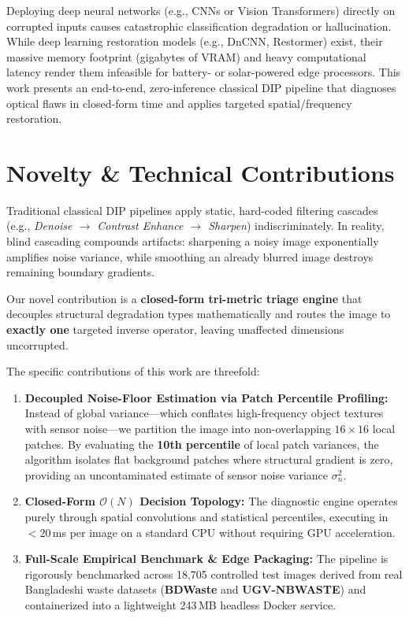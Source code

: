 \documentclass[conference]{IEEEtran}
\begin{document}
Deploying deep neural networks (e.g., CNNs or Vision Transformers) directly on corrupted inputs causes catastrophic classification degradation or hallucination. While deep learning restoration models (e.g., DnCNN, Restormer) exist, their massive memory footprint (gigabytes of VRAM) and heavy computational latency render them infeasible for battery- or solar-powered edge processors. This work presents an end-to-end, zero-inference classical DIP pipeline that diagnoses optical flaws in closed-form time and applies targeted spatial/frequency restoration.

\section{Novelty \& Technical Contributions}

\begin{tcolorbox}[colback=blue!5!white,colframe=blue!75!black,title=\textbf{Core Novelty: Dynamic Mathematical Triage vs. Blind Cascading}]
Traditional classical DIP pipelines apply static, hard-coded filtering cascades (e.g., \textit{Denoise $\rightarrow$ Contrast Enhance $\rightarrow$ Sharpen}) indiscriminately. In reality, blind cascading compounds artifacts: sharpening a noisy image exponentially amplifies noise variance, while smoothing an already blurred image destroys remaining boundary gradients. 

Our novel contribution is a \textbf{closed-form tri-metric triage engine} that decouples structural degradation types mathematically and routes the image to \textbf{exactly one} targeted inverse operator, leaving unaffected dimensions uncorrupted.
\end{tcolorbox}

The specific contributions of this work are threefold:
\begin{enumerate}
    \item \textbf{Decoupled Noise-Floor Estimation via Patch Percentile Profiling:} Instead of global variance—which conflates high-frequency object textures with sensor noise—we partition the image into non-overlapping $16 \times 16$ local patches. By evaluating the \textbf{10th percentile} of local patch variances, the algorithm isolates flat background patches where structural gradient is zero, providing an uncontaminated estimate of sensor noise variance $\sigma_n^2$.
    \item \textbf{Closed-Form $\mathcal{O}(N)$ Decision Topology:} The diagnostic engine operates purely through spatial convolutions and statistical percentiles, executing in $<20$\,ms per image on a standard CPU without requiring GPU acceleration.
    \item \textbf{Full-Scale Empirical Benchmark \& Edge Packaging:} The pipeline is rigorously benchmarked across 18,705 controlled test images derived from real Bangladeshi waste datasets (\textbf{BDWaste} and \textbf{UGV-NBWASTE}) and containerized into a lightweight 243\,MB headless Docker service.
\end{enumerate}
\end{document}
